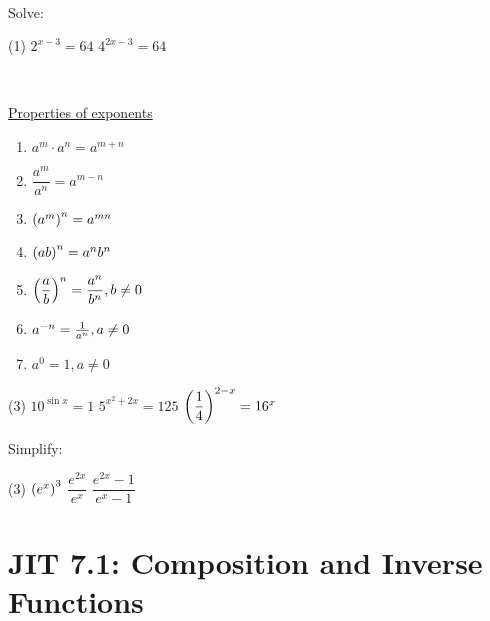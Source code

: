 \documentclass[../mathNotesPreamble]{subfiles}
\begin{document}
  
  \pagebreak
  \begin{ex*}\ 
  
  \noindent
  \begin{minipage}[t]{0.625\linewidth}
    
    Solve:
    \begin{tasks}[after-item-skip=0.125\paperheight](1)
      \task $2^{x-3}=64$
      \task $4^{2x-3}=64$
    \end{tasks}
  \end{minipage}%
  \begin{minipage}[t]{0.375\linewidth}\ 
  
    \begin{thmBox*}
    \underline{Properties of exponents}
    \begin{enumerate}
      \item $a^m\cdot a^n=a^{m+n}$
      \item $\dfrac{a^m}{a^n}=a^{m-n}$
      \item $\parens{a^m}^n=a^{mn}$
      \item $\parens{ab}^n=a^nb^n$
      \item $\parens{\dfrac{a}{b}}^n=\dfrac{a^n}{b^n}, b\neq 0$
      \item $a\inv[n]=\frac{1}{a^n}, a\neq 0$
      \item $a^0=1, a\neq 0$
    \end{enumerate}
    \end{thmBox*}
  \end{minipage}%
  \begin{tasks}[resume, after-item-skip=0.075\paperheight](3)
    \task $10^{\sin x}=1$
    \task $5^{x^2+2x}=125$
    \task $\parens{\dfrac{1}{4}}^{2-x}=16^x$
  \end{tasks}
  \end{ex*}
  
  \begin{ex*}
    Simplify:
    \begin{tasks}(3)
      \task $\parens{e^x}^3$
      \task $\dfrac{e^{2x}}{e^x}$
      \task $\dfrac{e^{2x}-1}{e^x-1}$
    \end{tasks}
  \end{ex*}
  
  \pagebreak
  
  \section{JIT 7.1: Composition and Inverse Functions}
  
\end{document}
